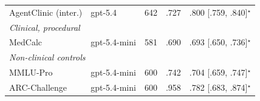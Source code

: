 \documentclass[journal,twoside]{IEEEtran}
\begin{document}
\begin{table}[!htb]
{\begin{tabular}{llrrl}
AgentClinic (inter.) & gpt-5.4 & 642 & .727 & .800 [.759, .840]$^\star$ \\
\multicolumn{5}{l}{\emph{Clinical, procedural}}\\
MedCalc & gpt-5.4-mini & 581 & .690 & .693 [.650, .736]$^\star$ \\
\multicolumn{5}{l}{\emph{Non-clinical controls}}\\
MMLU-Pro & gpt-5.4-mini & 600 & .742 & .704 [.659, .747]$^\star$ \\
ARC-Challenge & gpt-5.4-mini & 600 & .958 & .782 [.683, .874]$^\star$ \\
\bottomrule
\end{tabular}}
\end{table}

\begin{table}[!htb]
\caption{Per-source decomposition, \texttt{gpt-5.4-mini}. Under the standard split no source falls
below chance; under the hard split four of ten do. The collapse is a property of the difficulty
stratum rather than of any particular source.}
\label{tab:source}
\centering
\small
{}
\end{table}
\end{document}
